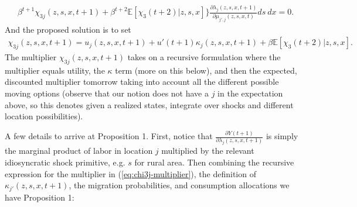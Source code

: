 \documentclass[12pt,pdftex]{article}
\begin{document}
\begin{onehalfspacing}
{\begin{align}
\nonumber \\
&\beta^{t+1}\chi_{3j}(z,s,x, t+1) + \beta^{t+2}\mathbb{E}\left[\chi_{3}(t+2) | z,s,x \right] \bigg \} \frac{\partial \lambda_{j}(z,s,x,t+1)}{\partial \mu_{j',j}(z,s,x,t)} ds \ dx = 0.
\end{align}}
And the proposed solution is to set
\begin{align}
\chi_{3j}(z, s, x, t+1) =  u_{j}(z,s,x,t+1) +  u'(t+1) \kappa_j(z,s,x,t+1) + \beta \mathbb{E}\left[\chi_{3}(t+2) |z, s, x \right].
\label{eq:chi3j-multiplier}
\end{align}
The multiplier $\chi_{3j}(z, s, x, t+1)$ takes on a recursive formulation where the multiplier equals utility, the $\kappa$ term (more on this below), and then the expected, discounted multiplier tomorrow taking into account all the different possible moving options (observe that our notion does not have a $j$ in the expectation above, so this denotes given a realized states, integrate over shocks and different location possibilities).


A few details to arrive at Proposition 1.  First, notice that $\frac{\partial Y(t+1)}{\partial \lambda_{j}(z, s, x, t+1)} $ is simply the marginal product of labor in location $j$ multiplied by the relevant idiosyncratic shock primitive, e.g. $s$ for rural area. Then combining the recursive expression for the multiplier in (\ref{eq:chi3j-multiplier}), the definition of $\kappa_{j'}(z, s,x,t+1)$,  the migration probabilities, and consumption allocations we have Proposition 1:


\end{onehalfspacing}
\end{document}
